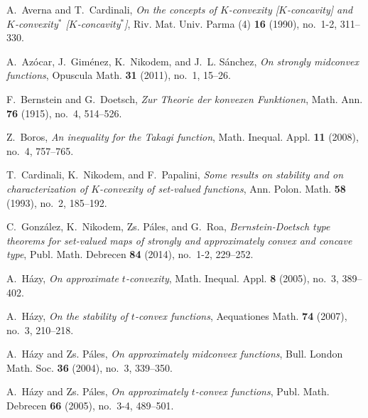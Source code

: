 \documentclass[12pt,reqno]{amsart}
\theoremstyle{definition}
\begin{document}
\def\cprime{$'$} 
\providecommand{\bysame}{\leavevmode\hbox to3em{\hrulefill}\thinspace}
\def\MR#1{}
\providecommand{\MRhref}[2]{%
  \href{http://www.ams.org/mathscinet-getitem?mr=#1}{#2}
}
\providecommand{\href}[2]{#2}
\begin{thebibliography}{10}

A.~Averna and T.~Cardinali, \emph{On the concepts of {$K$}-convexity
  [{$K$}-concavity] and {$K$}-convexity{$^*$} [{$K$}-concavity{$^*$}]}, Riv.
  Mat. Univ. Parma (4) \textbf{16} (1990), no.~1-2, 311–330. \MR{1105752
  (92h:26031)}

A.~Azócar, J.~Giménez, K.~Nikodem, and J.~L. Sánchez, \emph{On strongly
  midconvex functions}, Opuscula Math. \textbf{31} (2011), no.~1, 15–26.
  \MR{2739838 (2011k:26009)}

F.~Bernstein and G.~Doetsch, \emph{Zur {T}heorie der konvexen {F}unktionen},
  Math. Ann. \textbf{76} (1915), no.~4, 514–526. \MR{1511840}

Z.~Boros, \emph{{An inequality for the {T}akagi function}}, Math. Inequal.
  Appl. \textbf{11} (2008), no.~4, 757–765. \MR{2009f:39047}

T.~Cardinali, K.~Nikodem, and F.~Papalini, \emph{Some results on stability and
  on characterization of {$K$}-convexity of set-valued functions}, Ann. Polon.
  Math. \textbf{58} (1993), no.~2, 185–192. \MR{1239022 (94g:26022)}

C.~González, K.~Nikodem, Zs. Páles, and G.~Roa, \emph{{Bernstein-{D}oetsch
  type theorems for set-valued maps of strongly and approximately convex and
  concave type}}, Publ. Math. Debrecen \textbf{84} (2014), no.~1-2, 229–252.
  \MR{3194784}

A.~Házy, \emph{{On approximate {$t$}-convexity}}, Math. Inequal. Appl.
  \textbf{8} (2005), no.~3, 389–402. \MR{2148233 (2006c:26019)}

A.~Házy, \emph{{On the stability of {$t$}-convex functions}}, Aequationes Math.
  \textbf{74} (2007), no.~3, 210–218. \MR{2376448 (2008j:26012)}

A.~Házy and Zs. Páles, \emph{{On approximately midconvex functions}}, Bull.
  London Math. Soc. \textbf{36} (2004), no.~3, 339–350. \MR{2038721
  (2004j:26020)}

A.~Házy and Zs. Páles, \emph{{On approximately {$t$}-convex functions}}, Publ. Math. Debrecen
  \textbf{66} (2005), no.~3-4, 489–501. \MR{2137784 (2006c:26023)}


\end{thebibliography}
\end{document}
